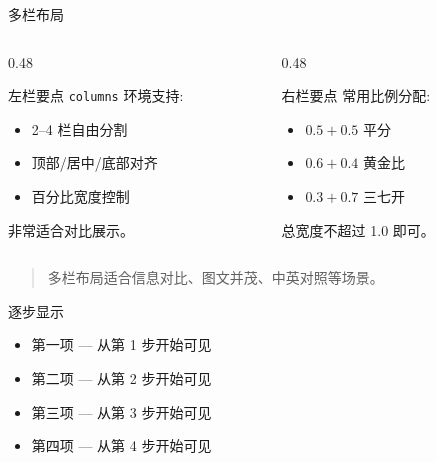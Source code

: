 \documentclass[aspectratio=169, 10pt, UTF8]{ctexbeamer}
\begin{document}
\begin{frame}{多栏布局}
  \begin{columns}[T]
    \begin{column}{0.48\textwidth}
      \begin{block}{左栏要点}
        \texttt{columns} 环境支持:
        \begin{itemize}
          \item 2--4 栏自由分割
          \item 顶部/居中/底部对齐
          \item 百分比宽度控制
        \end{itemize}
        非常适合对比展示。
      \end{block}
    \end{column}
    \begin{column}{0.48\textwidth}
      \begin{block}{右栏要点}
        常用比例分配:
        \begin{itemize}
          \item $0.5 + 0.5$ 平分
          \item $0.6 + 0.4$ 黄金比
          \item $0.3 + 0.7$ 三七开
        \end{itemize}
        总宽度不超过 1.0 即可。
      \end{block}
    \end{column}
  \end{columns}

  \vspace{0.5em}
  \begin{quote}
    多栏布局适合信息对比、图文并茂、中英对照等场景。
  \end{quote}
\end{frame}

\begin{frame}{逐步显示}
  \begin{itemize}
    \item<1-> 第一项 — 从第 1 步开始可见
    \item<2-> 第二项 — 从第 2 步开始可见
    \item<3-> 第三项 — 从第 3 步开始可见
    \item<4-> 第四项 — 从第 4 步开始可见
  \end{itemize}

  \vspace{0.8em}
\end{frame}
\end{document}
